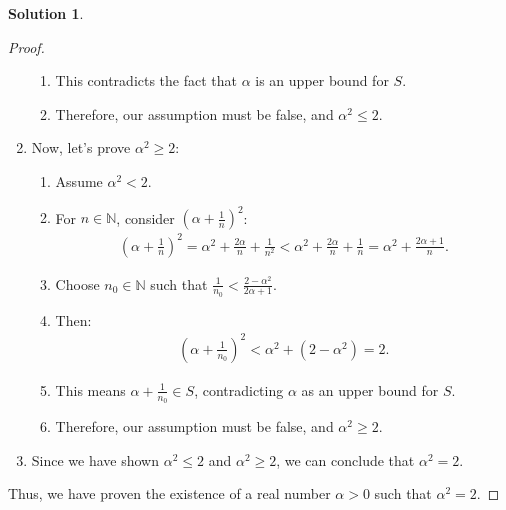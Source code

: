 \documentclass[12pt]{article}
\theoremstyle{definition} %
\newtheorem{solution}{Solution}
\theoremstyle{plain} %
\begin{document}
\begin{solution}
\begin{proof}
\begin{enumerate}
\begin{enumerate}
                \item This contradicts the fact that $\alpha$ is an upper bound for $S$.
                \item Therefore, our assumption must be false, and $\alpha^2 \leq 2$.
            \end{enumerate}
            \item Now, let's prove $\alpha^2 \geq 2$:
            \begin{enumerate}
                \item Assume $\alpha^2 < 2$.
                \item For $n \in \mathbb{N}$, consider $(\alpha + \frac{1}{n})^2$:
                \begin{align}
                \left( \alpha + \frac{1}{n} \right)^2 = \alpha^2 + \frac{2\alpha}{n} + \frac{1}{n^2} < \alpha^2 + \frac{2\alpha}{n} + \frac{1}{n} = \alpha^2 + \frac{2\alpha + 1}{n}.
                \end{align}
                \item Choose $n_0 \in \mathbb{N}$ such that $\frac{1}{n_0} < \frac{2 - \alpha^2}{2\alpha + 1}$.
                \item Then:
                \begin{align}
                \left( \alpha + \frac{1}{n_0} \right)^2 < \alpha^2 + (2 - \alpha^2) = 2.
                \end{align}
                \item This means $\alpha + \frac{1}{n_0} \in S$, contradicting $\alpha$ as an upper bound for $S$.
                \item Therefore, our assumption must be false, and $\alpha^2 \geq 2$.
            \end{enumerate}
            \item Since we have shown $\alpha^2 \leq 2$ and $\alpha^2 \geq 2$, we can conclude that $\alpha^2 = 2$.
        \end{enumerate}
        
        Thus, we have proven the existence of a real number $\alpha > 0$ such that $\alpha^2 = 2$. 
        
    \end{proof}
\end{solution}
\end{document}
